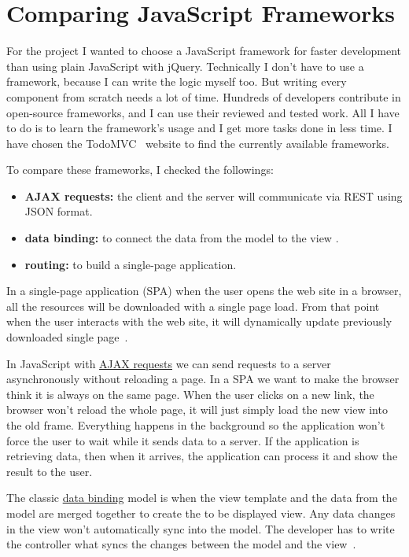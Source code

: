 \chapter{Comparing JavaScript Frameworks}

For the project I wanted to choose a JavaScript framework for faster development than using plain JavaScript with jQuery. Technically I don't have to use a framework, because I can write the logic myself too. But writing every component from scratch needs a lot of time. Hundreds of developers contribute in open-source frameworks, and I can use their reviewed and tested work. All I have to do is to learn the framework's usage and I get more tasks done in less time. I have chosen the TodoMVC~\cite{TodoMVC} website to find the currently available frameworks.

To compare these frameworks, I checked the followings:
\begin{itemize}
	\item \textbf{AJAX requests:} the client and the server  will communicate via REST using JSON format.
	\item \textbf{data binding:} to connect the data from the model to the view .
	\item \textbf{routing:} to build a single-page application.
\end{itemize}

In a single-page application (SPA) when the user opens the web site in a browser, all the resources will be downloaded with a single page load. From that point when the user interacts with the web site, it will dynamically update previously downloaded single page~\cite{SPA}.

In JavaScript with \underline{AJAX requests} we can send requests to a server asynchronously without reloading a page. In a SPA we want to make the browser think it is always on the same page. When the user clicks on a new link, the browser won't reload the whole page, it will just simply load the new view into the old frame. Everything happens in the background so the application won't force the user to wait while it sends data to a server. If the application is retrieving data, then when it arrives, the application can process it and show the result to the user.

The classic \underline{data binding} model is when the view template and the data from the model are merged together to create the to be displayed view. Any data changes in the view won't automatically sync into the model. The developer has to write the controller what syncs the changes between the model and the view~\cite{Angular-Developer-DataBinding}.

